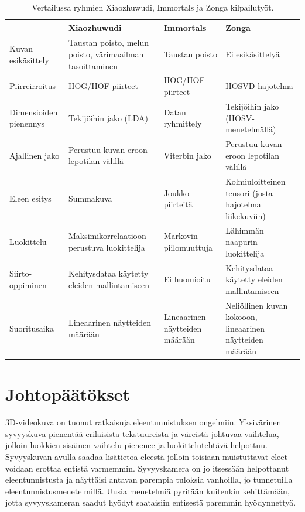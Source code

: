 \begin{table}[th]
\caption{Vertailussa ryhmien Xiaozhuwudi, Immortals ja Zonga kilpailutyöt. \citep{firstround}}
\label{table:kolmetyötä}
\begin{center}
\begin{tabular}{|p{}|p{}|p{}|p{}|} 
    \hline
 & Xiaozhuwudi & Immortals & Zonga\\
    \hline
    \hline
 Kuvan esikäsittely & Taustan poisto, melun poisto, värimaailman tasoittaminen& Taustan poisto & Ei esikäsittelyä\\
    \hline
 Piirreirroitus & HOG/HOF-piirteet & HOG/HOF-piirteet & HOSVD-hajotelma \\
    \hline
 Dimensioiden pienennys & Tekijöihin jako (LDA)& Datan ryhmittely & Tekijöihin jako (HOSV-menetelmällä)\\
    \hline	
 Ajallinen jako &Perustuu kuvan eroon lepotilan välillä &Viterbin jako &Perustuu kuvan eroon lepotilan välillä\\
     \hline
 Eleen esitys &Summakuva &Joukko piirteitä &Kolmiuloitteinen tensori (josta hajotelma liikekuviin)\\
     \hline
 Luokittelu &Maksimikorrelaatioon perustuva luokittelija &Markovin piilomuuttuja &Lähimmän naapurin luokittelija\\
      \hline
 Siirto-oppiminen &Kehitysdataa käytetty eleiden mallintamiseen&Ei huomioitu&Kehitysdataa käytetty eleiden mallintamiseen\\
      \hline
 Suoritusaika &Lineaarinen näytteiden määrään&Lineaarinen näytteiden määrään &Neliöllinen kuvan kokooon, lineaarinen näytteiden määrään\\
      \hline
	  \hline
\end{tabular}
\end{center}
\end{table}

\section {Johtopäätökset}

3D-videokuva on tuonut ratkaisuja eleentunnistuksen ongelmiin. Yksivärinen syvyyskuva pienentää erilaisista tekstuureista
ja väreistä johtuvaa vaihtelua, jolloin luokkien sisäinen vaihtelu pienenee ja luokittelutehtävä helpottuu. Syvyyskuvan avulla
saadaa lisätietoa eleestä jolloin toisiaan muistuttavat eleet voidaan erottaa entistä varmemmin. Syvyyskamera on jo itsessään
helpottanut eleentunnistusta ja näyttäisi antavan parempia tuloksia vanhoilla, jo tunnetuilla eleentunnistusmenetelmillä. Uusia menetelmiä
pyritään kuitenkin kehittämään, jotta syvyyskameran saadut hyödyt saataisiin entisestä paremmin hyödynnettyä.\\

